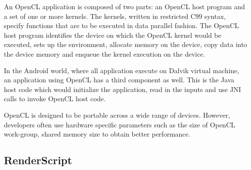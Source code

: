 An OpenCL application is composed of two parts: an OpenCL host program and a
set of one or more kernels. The kernels, written in restricted C99 syntax,
specify functions that are to be executed in data parallel fashion. The OpenCL
host program identifies the device on which the OpenCL kernel would be
executed, sets up the environment, allocate memory on the device, copy data
into the device memory and enqueue the kernel execution on the device.

In the Android world, where all application execute on Dalvik virtual machine,
an application using OpenCL has a third component as well. This is the Java
host code which would initialize the application, read in the inputs and use
JNI calls to invoke OpenCL host code.

OpenCL is designed to be portable across a wide range of devices. However,
developers often use hardware specific parameters such as the size of OpenCL
work-group, shared memory size to obtain better performance.
\subsection{RenderScript}

